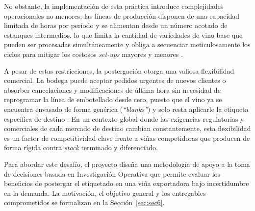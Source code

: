 No obstante, la implementación de esta práctica introduce complejidades operacionales no menores: las líneas de producción disponen de una capacidad limitada de horas por período y se alimentan desde un número acotado de estanques intermedios, lo que limita la cantidad de variedades de vino base que pueden ser procesadas simultáneamente y obliga a secuenciar meticulosamente los ciclos para mitigar los costosos \textit{set-ups} mayores y menores \cite{maccawley2022}.

A pesar de estas restricciones, la postergación otorga una valiosa flexibilidad comercial. La bodega puede aceptar pedidos urgentes de nuevos clientes o absorber cancelaciones y modificaciones de última hora sin necesidad de reprogramar la línea de embotellado desde cero, puesto que el vino ya se encuentra envasado de forma genérica (\textit{``blanks''}) y solo resta aplicarle la etiqueta específica de destino \cite{cholette2009, varas2018}. En un contexto global donde las exigencias regulatorias y comerciales de cada mercado de destino cambian constantemente, esta flexibilidad es un factor de competitividad clave frente a viñas competidoras que producen de forma rígida contra \textit{stock} terminado y diferenciado.

Para abordar este desafío, el proyecto diseña una metodología de apoyo a la toma de decisiones basada en Investigación Operativa que permite evaluar los beneficios de postergar el etiquetado en una viña exportadora bajo incertidumbre en la demanda. La motivación, el objetivo general y los entregables comprometidos se formalizan en la Sección~\ref{sec:sec6}.